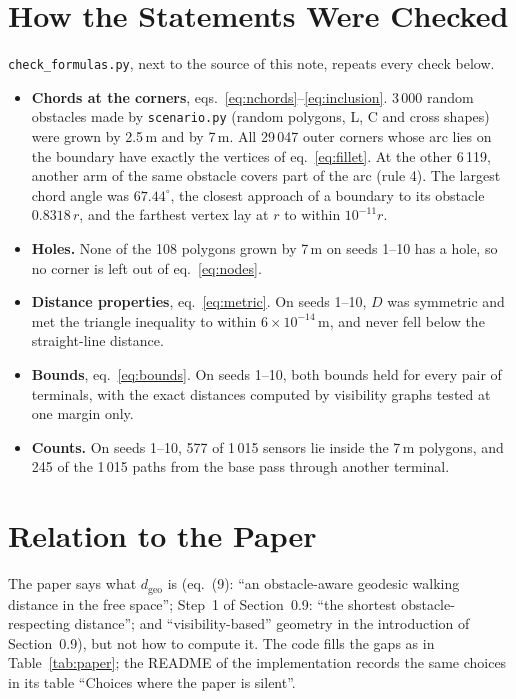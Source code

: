 \documentclass[10pt]{article}
\newcommand{\code}[1]{\texttt{#1}}
\newcommand{\dgeo}{d_{\mathrm{geo}}}
\begin{document}
\section{How the Statements Were Checked}
\label{sec:checks}

\code{check\_formulas.py}, next to the source of this note, repeats every check below.
\begin{itemize}[leftmargin=2em, itemsep=2pt]
  \item \textbf{Chords at the corners}, eqs.~\eqref{eq:nchords}--\eqref{eq:inclusion}. 3\,000 random obstacles made by
        \code{scenario.py} (random polygons, L, C and cross shapes) were grown by 2.5\,m and by 7\,m. All 29\,047 outer
        corners whose arc lies on the boundary have exactly the vertices of eq.~\eqref{eq:fillet}. At the other 6\,119,
        another arm of the same obstacle covers part of the arc (rule 4). The largest chord angle was $67.44^\circ$, the
        closest approach of a boundary to its obstacle $0.8318\,r$, and the farthest vertex lay at $r$ to within
        $10^{-11}r$.
  \item \textbf{Holes.} None of the 108 polygons grown by 7\,m on seeds 1--10 has a hole, so no corner is left out of
        eq.~\eqref{eq:nodes}.
  \item \textbf{Distance properties}, eq.~\eqref{eq:metric}. On seeds 1--10, $D$ was symmetric and met the triangle
        inequality to within $6 \times 10^{-14}$\,m, and never fell below the straight-line distance.
  \item \textbf{Bounds}, eq.~\eqref{eq:bounds}. On seeds 1--10, both bounds held for every pair of terminals, with the
        exact distances computed by visibility graphs tested at one margin only.
  \item \textbf{Counts.} On seeds 1--10, 577 of 1\,015 sensors lie inside the 7\,m polygons, and 245 of the 1\,015 paths
        from the base pass through another terminal.
\end{itemize}

\section{Relation to the Paper}

The paper says what $\dgeo$ is (eq.~(9): ``an obstacle-aware geodesic walking distance in the free space''; Step~1 of
Section~0.9: ``the shortest obstacle-respecting distance''; and ``visibility-based'' geometry in the introduction of
Section~0.9), but not how to compute it. The code fills the gaps as in Table~\ref{tab:paper}; the README of the
implementation records the same choices in its table ``Choices where the paper is silent''.
\end{document}
